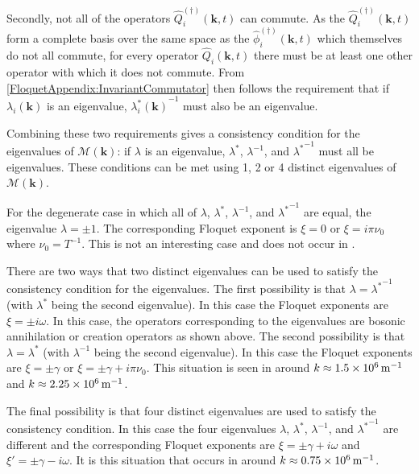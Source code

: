 Secondly, not all of the operators $\hat{Q}_i^{(\dagger)}(\bm{k}, t)$ can commute. As the $\hat{Q}_i^{(\dagger)}(\bm{k}, t)$ form a complete basis over the same space as the $\hat{\phi}_i^{(\dagger)}(\bm{k}, t)$ which themselves do not all commute, for every operator $\hat{Q}_i(\bm{k}, t)$ there must be at least one other operator with which it does not commute. From \eqref{FloquetAppendix:InvariantCommutator} then follows the requirement that if $\lambda_i(\bm{k})$ is an eigenvalue,   ${\lambda_i^*(\bm{k})}^{-1}$ must also be an eigenvalue.

Combining these two requirements gives a consistency condition for the eigenvalues of $\mathcal{M}(\bm{k})$: if $\lambda$ is an eigenvalue, $\lambda^*$, $\lambda^{-1}$, and ${\lambda^*}^{-1}$ must all be eigenvalues. These conditions can be met using 1, 2 or 4 distinct eigenvalues of $\mathcal{M}(\bm{k})$.

For the degenerate case in which all of $\lambda$, $\lambda^*$, $\lambda^{-1}$, and ${\lambda^*}^{-1}$ are equal, the eigenvalue $\lambda = \pm 1$. The corresponding Floquet exponent is $\xi = 0$ or $\xi = i \pi\nu_0$ where $\displaystyle \nu_0 = T^{-1}$. This is not an interesting case and does not occur in .

There are two ways that two distinct eigenvalues can be used to satisfy the consistency condition for the eigenvalues. The first possibility is that $\lambda = {\lambda^*}^{-1}$ (with $\lambda^*$ being the second eigenvalue). In this case the Floquet exponents are $\xi = \pm i \omega$. In this case, the operators corresponding to the eigenvalues are bosonic annihilation or creation operators as shown above. The second possibility is that $\lambda = \lambda^*$ (with $\lambda^{-1}$ being the second eigenvalue). In this case the Floquet exponents are $\xi = \pm \gamma$ or $\xi = \pm \gamma + i \pi \nu_0$. This situation is seen in  around $k \approx \unit[1.5 \times 10^6]{m}^{-1}$ and $k \approx \unit[2.25 \times 10^6]{m}^{-1}$.

The final possibility is that four distinct eigenvalues are used to satisfy the consistency condition. In this case the four eigenvalues $\lambda$, $\lambda^*$, $\lambda^{-1}$, and ${\lambda^*}^{-1}$ are different and the corresponding Floquet exponents are $\xi = \pm \gamma + i \omega$ and $\xi' = \pm \gamma - i\omega$. It is this situation that occurs in  around $k \approx \unit[0.75 \times 10^6]{m}^{-1}$.

